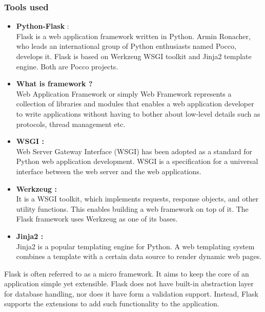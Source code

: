 \documentclass[hidelinks=true]{article}
\begin{document}
\subsubsection{Tools used}


\begin{itemize}
\item \textbf{\large Python-Flask} : \\ \normalsize{Flask is a web application framework written in Python. Armin Ronacher, who leads an international group of Python enthusiasts named Pocco, develops it. Flask is based on Werkzeug WSGI toolkit and Jinja2 template engine. Both are Pocco projects.}
\vspace{10pt}
\item \textbf{\large What is framework ?} \\ \normalsize{Web Application Framework or simply Web Framework represents a collection of libraries and modules that enables a web application developer to write applications without having to bother about low-level details such as protocols, thread management etc.}
\vspace{10pt}
\item \textbf{\large WSGI : } \\ \normalsize{Web Server Gateway Interface (WSGI) has been adopted as a standard for Python web application development. WSGI is a specification for a universal interface between the web server and the web applications.}
\vspace{10pt}
\item \textbf{\large Werkzeug : } \\ \normalsize{It is a WSGI toolkit, which implements requests, response objects, and other utility functions. This enables building a web framework on top of it. The Flask framework uses Werkzeug as one of its bases.}
\vspace{10pt}
\item \textbf{\large Jinja2 : } \\ \normalsize{Jinja2 is a popular templating engine for Python. A web templating system combines a template with a certain data source to render dynamic web pages.}
\end{itemize}

\large
Flask is often referred to as a micro framework. It aims to keep the core of an application simple yet extensible. Flask does not have built-in abstraction layer for database handling, nor does it have form a validation support. Instead, Flask supports the extensions to add such functionality to the application.
\end{document}

